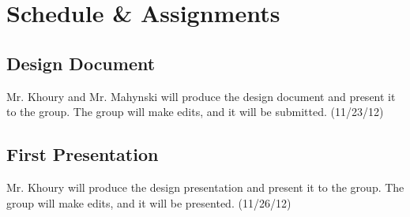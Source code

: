 \documentclass[10pt]{article}
\begin{document}

\section{Schedule \& Assignments}
\subsection{Design Document}
Mr. Khoury and Mr. Mahynski will produce the design document and present it to the group. The group will make edits, and it will be submitted. (11/23/12)

\subsection{First Presentation}
Mr. Khoury will produce the design presentation and present it to the group. The group will make edits, and it will be presented. (11/26/12)
\end{document}
